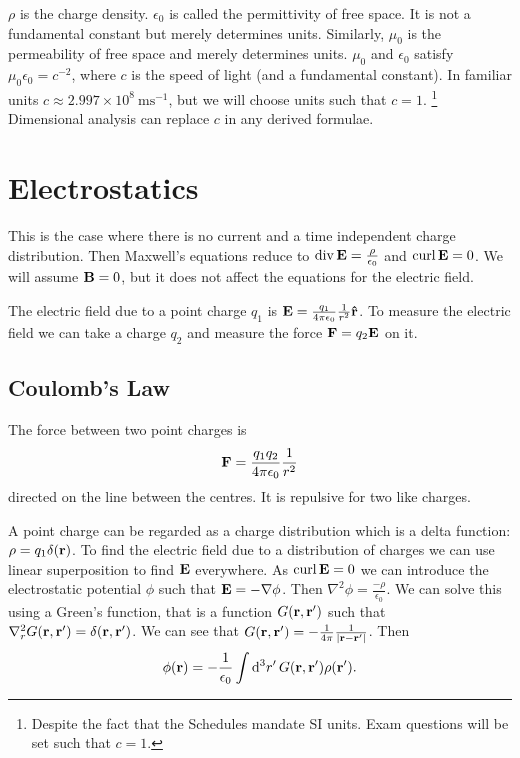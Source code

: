 \documentclass{notes}
\newcommand{\B}{\vect{B}}
\newcommand{\E}{\vect{E}}
\newcommand{\rv}{\vect{r}}
\newcommand{\rhat}{\vect{\Hat{r}}}
\DeclareMathOperator{\curl}{curl}
\DeclareMathOperator{\dive}{div}
\begin{document}
$\rho$ is the charge density.  $\epsilon_0$ is called the permittivity
of free space.  It is not a fundamental constant but merely determines
units.  Similarly, $\mu_0$ is the permeability of free space and
merely determines units.  $\mu_0$ and $\epsilon_0$ satisfy $\mu_0
\epsilon_0 = c^{-2}$, where $c$ is the speed of light (and a
fundamental constant).  In familiar units $c \approx 2.997 \times
10^8\ \mathrm{ms}^{-1}$, but we will choose units
such that $c = 1$.%
\footnote{Despite the fact that the Schedules mandate SI units.  Exam
questions will be set such that $c=1$.}
Dimensional analysis can replace $c$ in any derived formulae.

\section{Electrostatics}

This is the case where there is no current and a time independent
charge distribution.  Then Maxwell's equations reduce to $\dive \E =
\frac{\rho}{\epsilon_0}$ and $\curl \E = 0$.  We will assume $\B = 0$,
but it does not affect the equations for the electric field.

The electric field due to a point charge $q_1$ is $\E = \frac{q_1}{4 \pi
\epsilon_0} \frac{1}{r^2} \rhat$.  To measure the electric field we
can take a charge $q_2$ and measure the force $\vect{F} = q_2 \E$ on
it.

\subsection{Coulomb's Law}

The force between two point charges is
\[
\mathbf{F} = \frac{q_1 q_2}{4 \pi \epsilon_0} \frac{1}{r^2}
\]
directed on the line between the centres.  It is repulsive for two like
charges.

A point charge can be regarded as a charge distribution which is a
delta function: $\rho = q_1 \delta(\rv)$.  To find the electric field
due to a distribution of charges we can use linear superposition to
find $\E$ everywhere.  As $\curl \E = 0$ we can introduce the electrostatic
potential $\phi$ such that $\E = - \nabla \phi$.  Then $\nabla^2 \phi
= \frac{-\rho}{\epsilon_0}$.  We can solve this using a Green's function,
that is a function $G(\rv,\rv')$ such that $\nabla^2_r G(\rv,\rv') =
\delta(\rv,\rv')$. We can see that $G(\rv,\rv') = - \frac{1}{4 \pi}
\frac{1}{\abs{\rv - \rv'}}$.  Then
\[
\phi(\rv) = - \frac{1}{\epsilon_0} \int \ud^3 r'\, G(\rv,\rv') \rho(\rv').
\]
\end{document}
